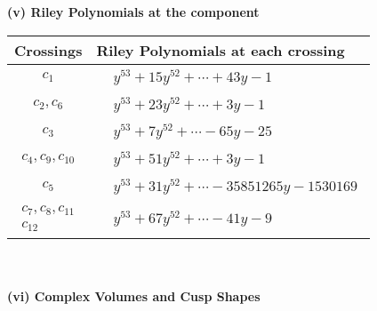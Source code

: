 \documentclass[1p]{elsarticle_modified}
\theoremstyle{definition}
\begin{document}
\newpage\renewcommand{\arraystretch}{1}
\flushleft \textbf{(v) Riley Polynomials at the component}\newline \\
\begin{tabular}{m{50pt}|m{274pt}}
Crossings & \hspace{64pt}Riley Polynomials at each crossing \\
\hline $$\begin{aligned}c_{1}\end{aligned}$$&$\begin{aligned}
&y^{53}+15 y^{52}+\cdots+43 y-1
\end{aligned}$\\
\hline $$\begin{aligned}c_{2},c_{6}\end{aligned}$$&$\begin{aligned}
&y^{53}+23 y^{52}+\cdots+3 y-1
\end{aligned}$\\
\hline $$\begin{aligned}c_{3}\end{aligned}$$&$\begin{aligned}
&y^{53}+7 y^{52}+\cdots-65 y-25
\end{aligned}$\\
\hline $$\begin{aligned}c_{4},c_{9},c_{10}\end{aligned}$$&$\begin{aligned}
&y^{53}+51 y^{52}+\cdots+3 y-1
\end{aligned}$\\
\hline $$\begin{aligned}c_{5}\end{aligned}$$&$\begin{aligned}
&y^{53}+31 y^{52}+\cdots-35851265 y-1530169
\end{aligned}$\\
\hline $$\begin{aligned}c_{7},c_{8},c_{11}\\c_{12}\end{aligned}$$&$\begin{aligned}
&y^{53}+67 y^{52}+\cdots-41 y-9
\end{aligned}$\\
\hline
\end{tabular}\\~\\
\newpage\flushleft \textbf{(vi) Complex Volumes and Cusp Shapes}
\end{document}
